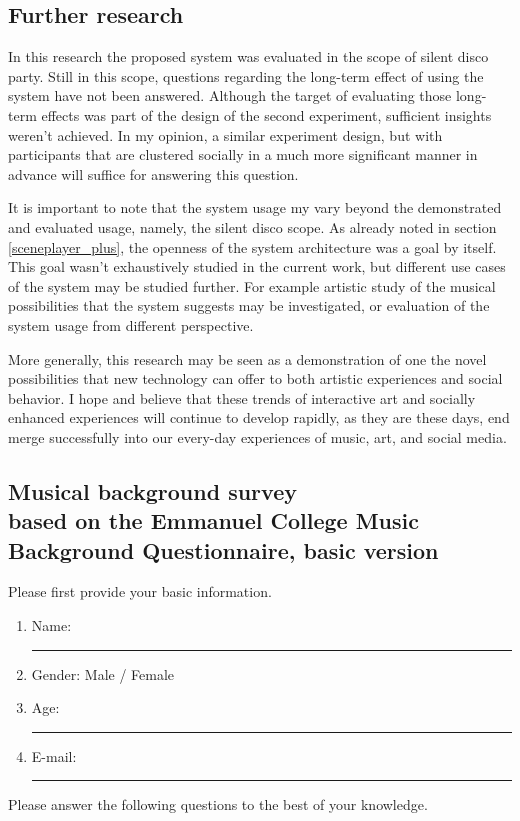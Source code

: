\documentclass[a4paper,11pt]{article}
\newcommand{\myunderline}{\rule{2in}{.5pt}}
\begin{document}
{\subsection{Further research}

In this research the proposed system was evaluated in the scope of silent disco party.
Still in this scope, questions regarding the long-term effect of using the system have not been answered.
Although the target of evaluating those long-term effects was part of the design of the second experiment, sufficient insights weren't achieved.
In my opinion, a similar experiment design, but with participants that are clustered socially in a much more significant manner in advance will suffice for answering this question.

It is important to note that the system usage my vary beyond the demonstrated and evaluated usage, namely, the silent disco scope.
As already noted in section \ref{sceneplayer_plus}, the openness of the system architecture was a goal by itself.
This goal wasn't exhaustively studied in the current work, but different use cases of the system may be studied further.
For example artistic study of the musical possibilities that the system suggests may be investigated, or evaluation of the system usage from different perspective.

More generally, this research may be seen as a demonstration of one the novel possibilities that new technology can offer to both artistic experiences and social behavior.
I hope and believe that these trends of interactive art and socially enhanced experiences will continue to develop rapidly, as they are these days, end merge successfully into our every-day experiences of music, art, and social media.

\begin{appendices}

\section[Musical background survey]{Musical background survey\\
	{\normalsize based on the Emmanuel College Music Background Questionnaire, basic version}}

Please first provide your basic information.

\begin{enumerate}
	\item Name: \myunderline
	\item Gender: Male / Female
	\item Age: \myunderline
	\item E-mail: \myunderline
\end{enumerate}
Please answer the following questions to the best of your knowledge.
\begin{enumerate}[resume]


\end{enumerate}
\end{appendices}}
\end{document}
